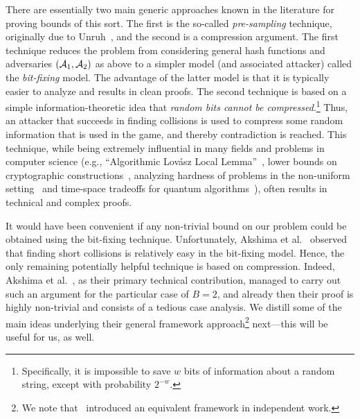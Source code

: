 There are essentially two main generic approaches known in the literature for proving bounds of this sort. The first is the so-called \emph{pre-sampling} technique, originally due to Unruh~\cite{Unruh07}, and the second is a compression argument. The first technique reduces the problem from considering general hash functions and adversaries $(\mathcal{A}_1,\mathcal{A}_2)$ as above to a simpler model (and associated attacker) called the \emph{bit-fixing} model. The advantage of the latter model is that it is typically easier to analyze and results in clean proofs. The second technique is based on a simple information-theoretic idea that \emph{random bits cannot be compressed}.\footnote{
Specifically,  it is impossible to save $w$ bits of information about a random string, except with probability $2^{-w}$.} Thus, an attacker that succeeds in finding collisions is used to compress some random information that is used in the game, and thereby contradiction is reached. This technique, while being extremely influential in many fields and problems in computer science (e.g., ``Algorithmic Lov{\'{a}}sz Local Lemma''~\cite{MoserT10}, lower bounds on cryptographic constructions~\cite{GennaroT00,DeTT10,GhoshalT20}, analyzing hardness of problems in the non-uniform setting~\cite{DodisGK17,CorriganGibbsK18}  and time-space tradeoffs for quantum algorithms~\cite{ChungGLQ20}), often results in technical and complex proofs.
 
It would have been convenient if any non-trivial bound on our problem could be obtained using the bit-fixing technique. Unfortunately, Akshima et al.~\cite{AkshimaCDW20} observed that finding short collisions is relatively easy in the {bit-fixing} model. Hence, the only remaining potentially helpful technique is based on compression. Indeed, Akshima et al.~\cite{AkshimaCDW20}, as their primary technical contribution, managed to carry out such an argument for the particular case of $B=2$, and already then their proof is highly non-trivial and consists of a tedious case analysis. We distill some of the main ideas underlying their general framework approach\footnote{We note that~\cite{ChungGLQ20} introduced an equivalent framework in independent work.} next—this will be useful for us, as well.

